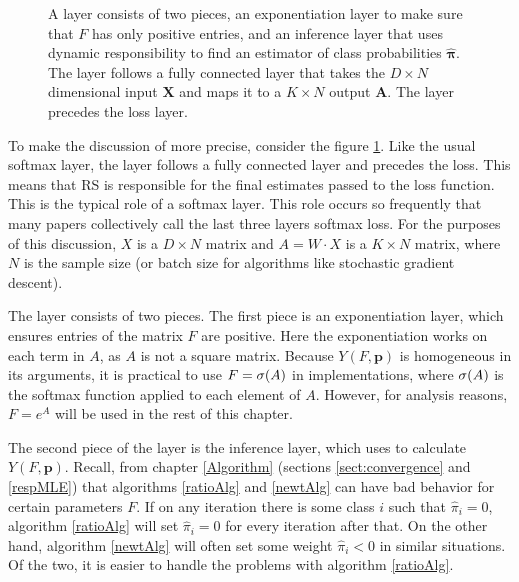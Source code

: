 \begin{figure}[h]
	\centering
	
	\caption[Graphical Model of the Responsible Softmax Layer]{A \RS layer consists of two pieces, an exponentiation layer to make sure that \( F \) has only positive entries, and an inference layer that uses dynamic responsibility to find an estimator of class probabilities \( \hat{\bm \pi} \).
	The \RS layer follows a fully connected layer that takes the \( D\times N \) dimensional input \( \bm X \) and maps it to a \( K \times N \) output \( \bm A \).  The \RS layer precedes the loss layer.} \label{fig:RSgraph}
\end{figure}

To make the discussion of \RS more precise, consider the figure \ref{fig:RSgraph}.  Like the usual softmax layer, the \RS layer follows a fully connected layer and precedes the loss.  This means that RS is responsible for the final estimates passed to the loss function. This is the typical role of a softmax layer. This role occurs so frequently that many papers collectively call the last three layers softmax loss.
For the purposes of this discussion, \( X \) is a \( D\times N \) matrix and \( A = W\cdot X\) is a \( K\times N \) matrix, where \( N \) is the sample size (or batch size for algorithms like stochastic gradient descent).

The \RS layer consists of two pieces.  The first piece is an exponentiation layer, which ensures entries of the matrix \( F \) are positive.  Here the exponentiation works on each term in \( A \), as \( A \) is not a square matrix. Because \( Y(F,\bm p) \) is homogeneous in its arguments, it is practical to use \( F=\sigma(A) \) in \RS implementations, where \( \sigma(A) \) is the softmax function applied to each element of \( A \).  However, for analysis reasons, \( F= e^{A} \) will be used in the rest of this chapter.

The second piece of the \RS layer is the inference layer, which uses \DR to calculate \( Y(F,\bm p) \). Recall, from chapter \ref{Algorithm} (sections \ref{sect:convergence} and \ref{respMLE}) that algorithms \ref{ratioAlg} and \ref{newtAlg} can have bad behavior for certain parameters \( F \). If on any iteration there is some class \( i \) such that \( \hat{\pi}_i = 0 \), algorithm \ref{ratioAlg} will set \(  \hat{\pi}_i = 0 \) for every iteration after that.  On the other hand, algorithm \ref{newtAlg} will often set some weight \( \hat{\pi}_i <0 \) in similar situations.  Of the two, it is easier to handle the problems with algorithm \ref{ratioAlg}.

